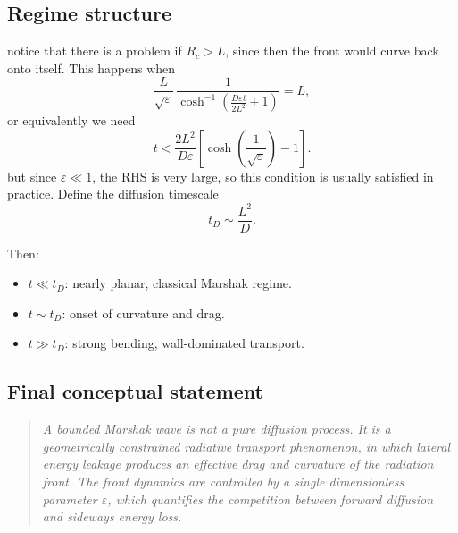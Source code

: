 \documentclass{article}
\begin{document}
\subsection*{Regime structure}
notice that there is a problem if $R_c > L$, since then the front would curve back onto itself.  This happens when
\[
\frac{L}{\sqrt{\varepsilon}}\,\frac{1}{\cosh^{-1}\!\left( \frac{D\varepsilon t}{2L^2} + 1 \right)} = L,
\]
or equivalently we need
\[
t < \frac{2L^2}{D\varepsilon}\left[\cosh(\frac{1}{\sqrt{\varepsilon}}) - 1\right].
\]
but since $\varepsilon \ll 1$, the RHS is very large, so this condition is usually satisfied in practice.
Define the diffusion timescale
\begin{equation}
t_D \sim \frac{L^2}{D}.
\end{equation}

Then:
\begin{itemize}
\item $t \ll t_D$: nearly planar, classical Marshak regime.
\item $t \sim t_D$: onset of curvature and drag.
\item $t \gg t_D$: strong bending, wall-dominated transport.
\end{itemize}

\subsection*{Final conceptual statement}

\begin{quote}
\emph{
A bounded Marshak wave is not a pure diffusion process.  
It is a geometrically constrained radiative transport phenomenon, in which lateral energy leakage produces an effective drag and curvature of the radiation front.  
The front dynamics are controlled by a single dimensionless parameter $\varepsilon$, which quantifies the competition between forward diffusion and sideways energy loss.
}
\end{quote}
\end{document}
